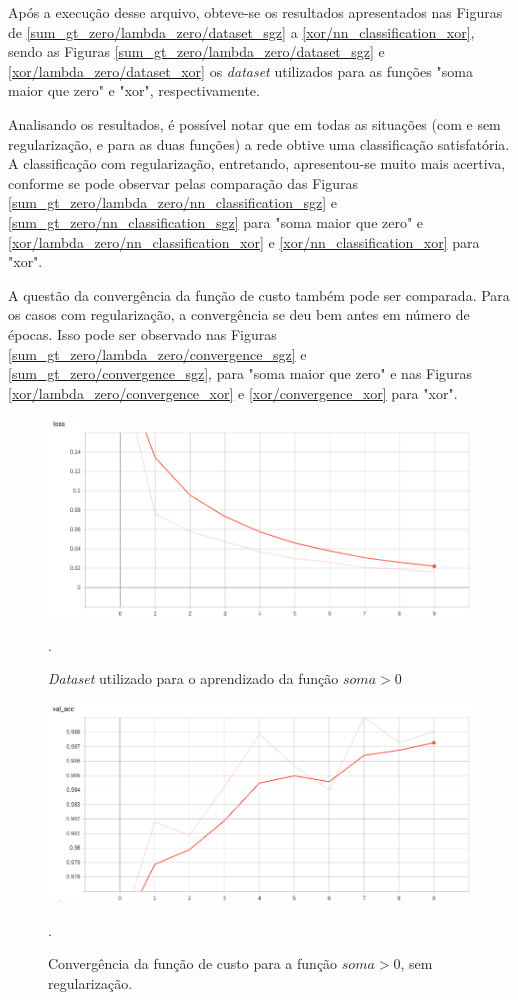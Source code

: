 \documentclass[conference]{IEEEtran}
\begin{document}
Após a execução desse arquivo, obteve-se os resultados apresentados nas Figuras de \ref{sum_gt_zero/lambda_zero/dataset_sgz} a \ref{xor/nn_classification_xor}, sendo as Figuras \ref{sum_gt_zero/lambda_zero/dataset_sgz} e \ref{xor/lambda_zero/dataset_xor} os \textit{dataset} utilizados para as funções "soma maior que zero" e "xor", respectivamente.

Analisando os resultados, é possível notar que em todas as situações (com e sem regularização, e para as duas funções) a rede obtive uma classificação satisfatória. A classificação com regularização, entretando, apresentou-se muito mais acertiva, conforme se pode observar pelas comparação das Figuras \ref{sum_gt_zero/lambda_zero/nn_classification_sgz} e \ref{sum_gt_zero/nn_classification_sgz} para "soma maior que zero" e \ref{xor/lambda_zero/nn_classification_xor} e \ref{xor/nn_classification_xor} para "xor". 

A questão da convergência da função de custo também pode ser comparada. Para os casos com regularização, a convergência se deu bem antes em número de épocas. Isso pode ser observado nas Figuras \ref{sum_gt_zero/lambda_zero/convergence_sgz} e \ref{sum_gt_zero/convergence_sgz}, para "soma maior que zero" e nas Figuras \ref{xor/lambda_zero/convergence_xor} e \ref{xor/convergence_xor} para "xor". 

\begin{figure}[htbp]
\centering
\centerline{\includegraphics[scale=0.25]{imagens/loss.png}}
\caption{\textit{Dataset} utilizado para o aprendizado da função $soma > 0$}.
\label{loss}
\end{figure}

\begin{figure}[htbp]
\centering
\centerline{\includegraphics[scale=0.25]{imagens/val_acc.png}}
\caption{Convergência da função de custo para a função $soma > 0$, sem regularização.}.
\label{val_acc}
\end{figure}
\end{document}
